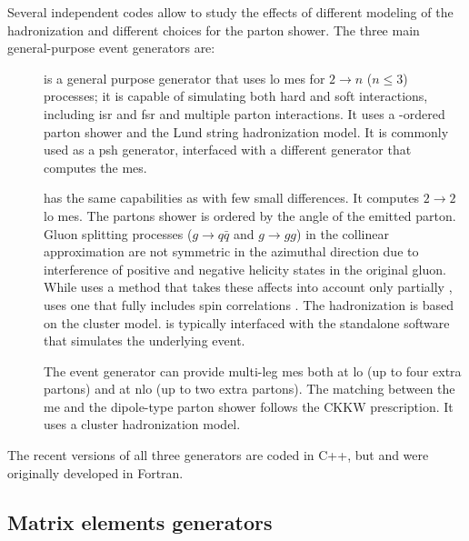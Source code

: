 Several independent codes allow to study the effects of different modeling of the hadronization and different choices for the parton shower. The three main general-purpose event generators are:

\begin{description}
\item[\PY] \cite{Sjostrand:2006za,Sjostrand:2014zea} \PY is a general purpose generator that uses \gls{lo} \glspl{me} for $2\rightarrow n $ ($n \leq 3$) processes; 
it is capable of simulating both hard and soft interactions, including \gls{isr} and \gls{fsr} and multiple parton interactions.
It uses a \pt-ordered parton shower and the Lund string hadronization model. It is commonly used as a \gls{psh} generator, interfaced with a different generator that computes the \glspl{me}.

\item[\HW] \cite{Corcella:2000bw,Bahr:2008pv,Bellm:2015jjp} has the same capabilities as \PY with few small differences. 
It computes $2\rightarrow 2$ \gls{lo} \glspl{me}.
 The partons shower is ordered by the angle of the emitted parton. Gluon splitting processes ($g \rightarrow q\bar{q}$ and $g \rightarrow gg$) in the collinear approximation are not symmetric in the azimuthal direction due to interference of positive and negative helicity states in the original gluon. 
While \PY uses a method that takes these affects into account only partially \cite{Webber:1987uy}, \HW uses one that fully includes spin correlations \cite{Collins:1987cp}. The hadronization is based on the cluster model.
\HW is typically interfaced with the standalone software \jimmy \cite{Butterworth:1996zw} that simulates the underlying event.

\item[\Sherpa] \cite{Gleisberg:2008ta} The \Sherpa event generator can provide multi-leg \glspl{me} both at \gls{lo} (up to four extra partons) and at \gls{nlo} (up to two extra partons). 
The matching between the \gls{me} and the dipole-type parton shower \cite{Schumann:2007mg} follows the CKKW prescription.
It uses a cluster hadronization model. 

\end{description}

The recent versions of all three generators are coded in C++, but \HW and \PY were originally developed in Fortran.  

\subsection{Matrix elements generators}

